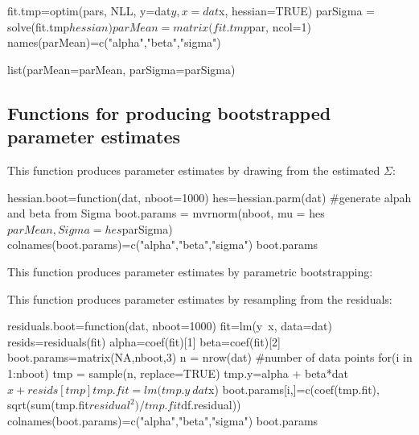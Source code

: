 {\begin{Schunk}
\begin{Sinput}
{   fit.tmp=optim(pars, NLL, y=dat$y, x=dat$x, hessian=TRUE)
   parSigma = solve(fit.tmp$hessian)
   parMean = matrix(fit.tmp$par, ncol=1)
   names(parMean)=c("alpha","beta","sigma")
   
   list(parMean=parMean, parSigma=parSigma)
 }
\end{Sinput}
\end{Schunk}

\subsection{Functions for producing bootstrapped parameter estimates}

This function produces parameter estimates by drawing from the estimated $\Sigma$:
\begin{Schunk}
\begin{Sinput}
 hessian.boot=function(dat, nboot=1000){
   hes=hessian.parm(dat)  
   #generate alpah and beta from Sigma
   boot.params = mvrnorm(nboot, mu = hes$parMean, Sigma = hes$parSigma)
   colnames(boot.params)=c("alpha","beta","sigma")
   boot.params
 }
\end{Sinput}
\end{Schunk}

This function produces parameter estimates by parametric bootstrapping:
\begin{Schunk}
\end{Schunk}

This function produces parameter estimates by resampling from the residuals:
\begin{Schunk}
\begin{Sinput}
 residuals.boot=function(dat, nboot=1000){
   fit=lm(y~x, data=dat)
   resids=residuals(fit)  
   alpha=coef(fit)[1]
   beta=coef(fit)[2]
   boot.params=matrix(NA,nboot,3)
   n = nrow(dat) #number of data points
   for(i in 1:nboot){
     tmp = sample(n, replace=TRUE)
     tmp.y=alpha + beta*dat$x + resids[tmp]
     tmp.fit=lm(tmp.y~dat$x)
     boot.params[i,]=c(coef(tmp.fit), 
                       sqrt(sum(tmp.fit$residual^2)/tmp.fit$df.residual))
   }
   colnames(boot.params)=c("alpha","beta","sigma")
   boot.params
 }
\end{Sinput}
\end{Schunk}

}
